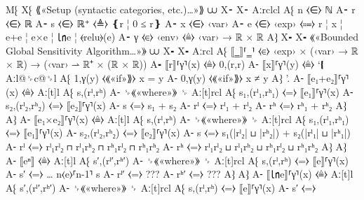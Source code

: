 \documentclass{article}
\begin{document}
M⁅ 
X⁅ ⟪«Setup (syntactic categories, etc.)…»⟫ ⩊
X⁃
X⁃ Aːrclcl
   A⁅ n   ⧼∈⧽ ℕ
   A⁃ r   ⧼∈⧽ ℝ
   A⁃ s   ⧼∈⧽ ℝ⁺    ⧼≜⧽ ❴r ¦ 0 ≤ r❵
   A⁃ x   ⧼∈⧽ ‹var›
   A⁃ e   ⧼∈⧽ ‹exp› ⧼⩴⧽ r ¦ x ¦ e+e ¦ e×e ¦ ㏑e ¦ ⦑relu⦒(e)
   A⁃ γ   ⧼∈⧽ ‹env› ⧼≜⧽ ‹var› → ℝ × ℝ
   A⁆
X⁃
X⁃ ⟪«Bounded Global Sensitivity Algorithm…»⟫ ⩊
X⁃
X⁃ Aːrcl
   A⁅ ⟦‗⟧⸢‗⸣            ⧼∈⧽ ‹exp› × (‹var› → ℝ × ℝ) → (‹var› ⇀ ℝ⁺ × (ℝ × ℝ))
   A⁃ ⟦r⟧⸢γ⸣(x)         ⧼≜⧽ 0,(r,r)
   A⁃ ⟦x⟧⸢γ⸣(y)         ⧼≜⧽ ‘❴ Aːl@{␠}c@{␠}l
                               A⁅ 1,γ(y) ⧼⟪«if»⟫⧽ x = y
                               A⁃ 0,γ(y) ⧼⟪«if»⟫⧽ x ≠ y
                               A⁆ ’.
   A⁃ ⟦e₁+e₂⟧⸢γ⸣(x)     ⧼≜⧽ Aː[t]l
                            A⁅ s,(rˡ,rʰ)
                            A⁃ ␠⟪«where»⟫ ␠ Aː[t]rcl
                                            A⁅ s₁,(rˡ₁,rʰ₁) ⧼=⧽ ⟦e₁⟧⸢γ⸣(x)
                                            A⁃ s₂,(rˡ₂,rʰ₂) ⧼=⧽ ⟦e₂⟧⸢γ⸣(x)
                                            A⁃ s            ⧼=⧽ s₁ + s₂
                                            A⁃ rˡ           ⧼=⧽ rˡ₁ + rˡ₂
                                            A⁃ rʰ           ⧼=⧽ rʰ₁ + rʰ₂
                                            A⁆
                            A⁆
   A⁃ ⟦e₁×e₂⟧⸢γ⸣(x)     ⧼≜⧽ Aː[t]l
                            A⁅ s,(rˡ,rʰ)
                            A⁃ ␠⟪«where»⟫ ␠ Aː[t]rcl
                                            A⁅ s₁,(rˡ₁,rʰ₁) ⧼=⧽ ⟦e₁⟧⸢γ⸣(x)
                                            A⁃ s₂,(rˡ₂,rʰ₂) ⧼=⧽ ⟦e₂⟧⸢γ⸣(x)
                                            A⁃ s ⧼=⧽ s₁(|rˡ₂| ⊔ |rʰ₂|) + s₂(|rˡ₁| ⊔ |rʰ₁|)
                                            A⁃ rˡ ⧼=⧽ rˡ₁rˡ₂ ⊓ rˡ₁rʰ₂ ⊓ rʰ₁rˡ₂ ⊓ rʰ₁rʰ₂
                                            A⁃ rʰ ⧼=⧽ rˡ₁rˡ₂ ⊔ rˡ₁rʰ₂ ⊔ rʰ₁rˡ₂ ⊔ rʰ₁rʰ₂
                                            A⁆
                            A⁆
   A⁃ ⟦eⁿ⟧                ⧼≜⧽ Aː[t]l
                              A⁅ s′,(rˡ′,rʰ′)
                              A⁃ ␠⟪«where»⟫ ␠ Aː[t]rcl
                                              A⁅ s,(rˡ,rʰ) ⧼=⧽ ⟦e⟧⸢γ⸣(x)
                                              A⁃ s′ ⧼=⧽ … n⟨e⟩⸢n-1⸣ s
                                              A⁃ rˡ′ ⧼=⧽ ???
                                              A⁃ rʰ′ ⧼=⧽ ???
                                              A⁆
                            A⁆
   A⁃ ⟦㏑e⟧⸢γ⸣(x)         ⧼≜⧽ Aː[t]l
                              A⁅ s′,(rˡ′,rʰ′)
                              A⁃ ␠⟪«where»⟫ ␠ Aː[t]rcl
                                              A⁅ s,(rˡ,rʰ) ⧼=⧽ ⟦e⟧⸢γ⸣(x)
                                              A⁃ s′ ⧼=⧽ 
\end{document}
